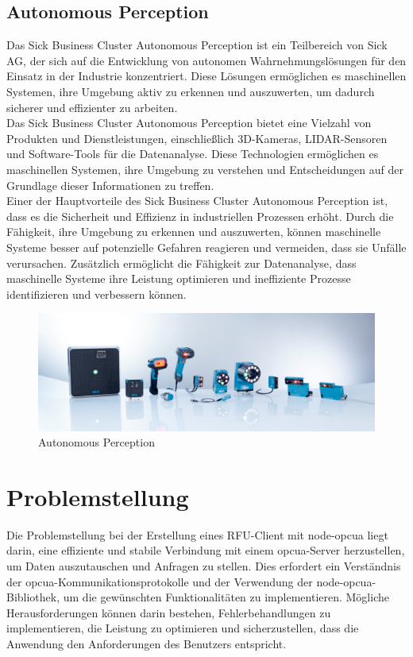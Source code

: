 \subsection{Autonomous Perception}

Das Sick Business Cluster Autonomous Perception ist ein Teilbereich von Sick AG, der sich auf die Entwicklung von autonomen Wahrnehmungslösungen für den Einsatz in der Industrie konzentriert. Diese Lösungen ermöglichen es maschinellen Systemen, ihre Umgebung aktiv zu erkennen und auszuwerten, um dadurch sicherer und effizienter zu arbeiten.\\

Das Sick Business Cluster Autonomous Perception bietet eine Vielzahl von Produkten und Dienstleistungen, einschließlich 3D-Kameras, LIDAR-Sensoren und Software-Tools für die Datenanalyse. Diese Technologien ermöglichen es maschinellen Systemen, ihre Umgebung zu verstehen und Entscheidungen auf der Grundlage dieser Informationen zu treffen.\\

Einer der Hauptvorteile des Sick Business Cluster Autonomous Perception ist, dass es die Sicherheit und Effizienz in industriellen Prozessen erhöht. Durch die Fähigkeit, ihre Umgebung zu erkennen und auszuwerten, können maschinelle Systeme besser auf potenzielle Gefahren reagieren und vermeiden, dass sie Unfälle verursachen. Zusätzlich ermöglicht die Fähigkeit zur Datenanalyse, dass maschinelle Systeme ihre Leistung optimieren und ineffiziente Prozesse identifizieren und verbessern können.\\

\begin{figure}[htp]
    \centering
    \includegraphics[width=(\textwidth)]{Bild/Identification solutions.jpg}
    \caption{Autonomous Perception\cite{.17.08.2021}}
    \label{fig:Autonomous Perception}
\end{figure}


\section{Problemstellung}
Die Problemstellung bei der Erstellung eines RFU-Client mit node-opcua liegt darin, eine effiziente und stabile Verbindung mit einem \ac{opcua}-Server herzustellen, um Daten auszutauschen und Anfragen zu stellen. 
Dies erfordert ein Verständnis der \ac{opcua}-Kommunikationsprotokolle und der Verwendung der node-opcua-Bibliothek, um die gewünschten Funktionalitäten zu implementieren. Mögliche Herausforderungen können darin bestehen, Fehlerbehandlungen zu implementieren, die Leistung zu optimieren und sicherzustellen, dass die Anwendung den Anforderungen des Benutzers entspricht.
